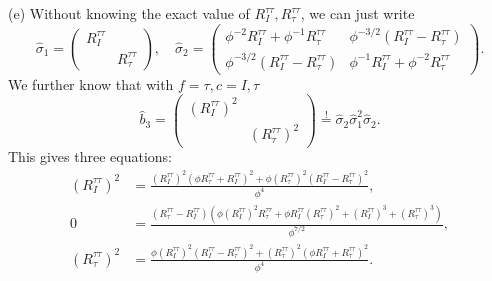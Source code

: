\documentclass{book}
\begin{document}
(e) Without knowing the exact value of $R_{I}^{\tau \tau } ,R_{\tau }^{\tau \tau }$, we can just write
\begin{equation*}
\hat{\sigma }_{1} =\begin{pmatrix}
R_{I}^{\tau \tau } & \\
 & R_{\tau }^{\tau \tau }
\end{pmatrix} ,\quad \hat{\sigma }_{2} =\begin{pmatrix}
\phi ^{-2} R_{I}^{\tau \tau } +\phi ^{-1} R_{\tau }^{\tau \tau } & \phi ^{-3/2} (R_{I}^{\tau \tau } -R_{\tau }^{\tau \tau } )\\
\phi ^{-3/2} (R_{I}^{\tau \tau } -R_{\tau }^{\tau \tau } ) & \phi ^{-1} R_{I}^{\tau \tau } +\phi ^{-2} R_{\tau }^{\tau \tau }
\end{pmatrix} .
\end{equation*}
We further know that with $f=\tau ,c=I,\tau $
\begin{equation*}
\hat{b}_{3} =\begin{pmatrix}
(R_{I}^{\tau \tau } )^{2} & \\
 & (R_{\tau }^{\tau \tau } )^{2}
\end{pmatrix}\stackrel{!}{=}\hat{\sigma }_{2}\hat{\sigma }_{1}^{2}\hat{\sigma }_{2} .
\end{equation*}
This gives three equations:
\begin{equation*}
\begin{aligned}
(R_{I}^{\tau \tau } )^{2} & =\frac{(R_{I}^{\tau \tau } )^{2} (\phi R_{\tau }^{\tau \tau } +R_{I}^{\tau \tau } )^{2} +\phi (R_{\tau }^{\tau \tau } )^{2} (R_{I}^{\tau \tau } -R_{\tau }^{\tau \tau } )^{2}}{\phi ^{4}} ,\\
0 & =\frac{(R_{\tau }^{\tau \tau } -R_{I}^{\tau \tau } )(\phi (R_{I}^{\tau \tau } )^{2} R_{\tau }^{\tau \tau } +\phi R_{I}^{\tau \tau } (R_{\tau }^{\tau \tau } )^{2} +(R_{I}^{\tau \tau } )^{3} +(R_{\tau }^{\tau \tau } )^{3} )}{\phi ^{7/2}} ,\\
(R_{\tau }^{\tau \tau } )^{2} & =\frac{\phi (R_{I}^{\tau \tau } )^{2} (R_{I}^{\tau \tau } -R_{\tau }^{\tau \tau } )^{2} +(R_{\tau }^{\tau \tau } )^{2} (\phi R_{I}^{\tau \tau } +R_{\tau }^{\tau \tau } )^{2}}{\phi ^{4}} .
\end{aligned}
\end{equation*}
\end{document}
